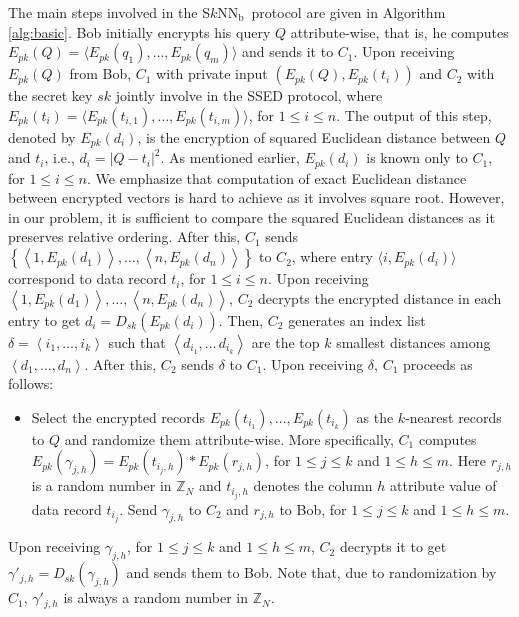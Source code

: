 \documentclass{article}
\newcommand{\sknnb}{S$k$NN$_\textrm{b}$}
\begin{document}
The main steps involved in the \sknnb~protocol are given in Algorithm \ref{alg:basic}.
Bob initially encrypts his query $Q$ attribute-wise, that 
is, he computes $E_{pk}(Q) = \langle E_{pk}(q_1),\ldots, E_{pk}(q_m)\rangle$ and 
sends it to $C_1$. 
Upon receiving $E_{pk}(Q)$ from Bob, $C_1$ with private input $(E_{pk}(Q), E_{pk}(t_i))$ 
and $C_2$ with the secret key $sk$ jointly involve in the SSED protocol, where 
$E_{pk}(t_i) = \langle E_{pk}(t_{i,1}), \ldots, E_{pk}(t_{i,m})\rangle$, for $1 \le i \le n$. 
The output of this step, denoted by $E_{pk}(d_i)$, is the encryption of 
squared Euclidean distance between $Q$ and $t_i$, i.e., $d_i = |Q - t_i|^2$. As mentioned earlier, $E_{pk}(d_i)$ is 
known only to $C_1$, for $1 \le i \le n$. 
We emphasize that computation of exact Euclidean distance between encrypted 
vectors is hard to achieve as it involves square root. However, in our 
problem, it is sufficient to compare the squared Euclidean distances as 
it preserves relative ordering. After this, $C_1$ sends $\left\{\left\langle 1,E_{pk}(d_1)
\right\rangle,\dots,\left\langle n,E_{pk}(d_n)\right\rangle\right\}$ to $C_2$, where entry $\langle i, E_{pk}(d_i)\rangle$ 
correspond to data record $t_i$, for $1 \le i \le n$. 
Upon receiving $\left\langle 1,E_{pk}(d_1)\right\rangle,\dots,\left\langle n,E_{pk}(d_n)\right\rangle$, 
$C_2$ decrypts the encrypted distance in each entry to 
get $d_i = D_{sk}(E_{pk}(d_i))$. Then, $C_2$ generates an index list  
$\delta = \left\langle i_1,\ldots,i_k \right\rangle$  
such that $\left\langle d_{i_1},\ldots\,d_{i_k}\right\rangle$ are the top $k$ smallest distances 
among $\left\langle d_1,\dots,d_n \right\rangle$. After this, $C_2$ sends $\delta$ to $C_1$. 
Upon receiving $\delta$, $C_1$ proceeds as follows: 
\begin{itemize}
\item Select the encrypted records $E_{pk}(t_{i_1}),\dots,E_{pk}(t_{i_k})$ as the $k$-nearest 
records to $Q$ and randomize them attribute-wise. More specifically, $C_1$ computes 
$E_{pk}(\gamma_{j,h}) = E_{pk}(t_{i_j,h})* E_{pk}(r_{j,h})$, for $1 \le j \le k$ and $1\le h \le m$. 
Here $r_{j,h}$ is a random number in $\mathbb{Z}_N$ and $t_{i_j,h}$ denotes the column $h$ attribute 
value of data record $t_{i_j}$. Send $\gamma_{j,h}$ to $C_2$ and $r_{j,h}$ to Bob, for $1 \le j \le k$ and $1\le h \le m$. 
\end{itemize}
Upon receiving $\gamma_{j,h}$, for $1 \le j \le k$ and $1\le h \le m$, $C_2$ decrypts it 
to get $\gamma'_{j,h} = D_{sk}(\gamma_{j,h})$ and sends them to Bob. Note that, due to randomization 
by $C_1$, $\gamma'_{j,h}$ is always a random number in $\mathbb{Z}_N$.
\end{document}
